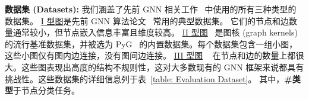 \textbf{数据集 (Datasets): }
我们涵盖了先前 GNN 相关工作~\cite{wang2019dgl, pyG, ma2019neugraph} 中使用的所有三种类型的数据集。
\underline{I 型图}是先前 GNN 算法论文~\cite{GCNConv, GINConv, SageConv} 常用的典型数据集。
它们的节点和边数量通常较小，但节点嵌入信息丰富且维度较高。
\underline{II 型图}~\cite{KKMMN2016} 是图核 (graph kernels) 的流行基准数据集，并被选为 PyG~\cite{pyG} 的内置数据集。每个数据集包含一组小图，这些小图仅有图内边连接，没有图间边连接。
\underline{III 型图} ~\cite{snapnets, GCNConv} 在节点和边的数量上都很大。这些图表现出高度的结构不规则性，这对大多数现有的 GNN 框架来说都具有挑战性。这些数据集的详细信息列于表~\ref{table: Evaluation Dataset}。
其中，\textbf{\#类型}于节点分类任务。
